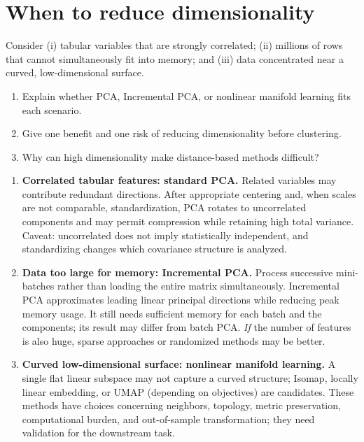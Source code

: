 \section{When to reduce dimensionality}
\label{sec:ex9}
\begin{problem}
Consider (i) tabular variables that are strongly correlated; (ii) millions of rows that cannot simultaneously fit into memory; and (iii) data concentrated near a curved, low-dimensional surface.
\begin{enumerate}[label=\textbf{(\alph*)}]
\item Explain whether PCA, Incremental PCA, or nonlinear manifold learning fits each scenario.
\item Give one benefit and one risk of reducing dimensionality before clustering.
\item Why can high dimensionality make distance-based methods difficult?
\end{enumerate}
\end{problem}


\begin{enumerate}[label=\textbf{Scenario \roman*.}]
\item \textbf{Correlated tabular features: standard PCA.} Related variables may contribute redundant directions. After appropriate centering and, when scales are not comparable, standardization, PCA rotates to uncorrelated components and may permit compression while retaining high total variance. Caveat: uncorrelated does not imply statistically independent, and standardizing changes which covariance structure is analyzed.
\item \textbf{Data too large for memory: Incremental PCA.} Process successive mini-batches rather than loading the entire matrix simultaneously. Incremental PCA approximates leading linear principal directions while reducing peak memory usage. It still needs sufficient memory for each batch and the components; its result may differ from batch PCA. \emph{If} the number of features is also huge, sparse approaches or randomized methods may be better.
\item \textbf{Curved low-dimensional surface: nonlinear manifold learning.} A single flat linear subspace may not capture a curved structure; Isomap, locally linear embedding, or UMAP (depending on objectives) are candidates. These methods have choices concerning neighbors, topology, metric preservation, computational burden, and out-of-sample transformation; they need validation for the downstream task.
\end{enumerate}

